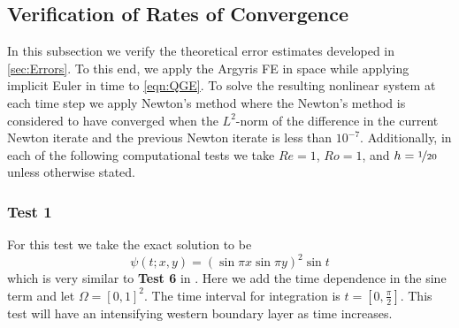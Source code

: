 \subsection{Verification of Rates of Convergence}
In this subsection we verify the theoretical error estimates developed in
\autoref{sec:Errors}. To this end, we apply the Argyris FE in space while
applying implicit Euler in time to \eqref{eqn:QGE}. To solve the resulting
nonlinear system at each time step we apply Newton's method where the Newton's
method is considered to have converged when the $L^2$-norm of the difference in
the current Newton iterate and the previous Newton iterate is less than
$10^{-7}$. Additionally, in each of the following computational tests we take
$Re = 1$, $Ro = 1$, and $h = \nicefrac{1}{20}$ unless otherwise stated.

\subsubsection*{Test 1}
For this test we take the exact solution to be
\begin{equation}
  \psi(t;x,y) = \left(\sin \pi x \sin \pi y\right)^2 \sin t
  \label{eqn:Test1}
\end{equation}
which is very similar to \textbf{Test 6} in \cite{Foster}. Here we add the time
dependence in the sine term and let $\Omega = [0,1]^2$. The time interval for
integration is $t = [0,\frac{\pi}{2}]$. This test will have an intensifying
western boundary layer as time increases.

